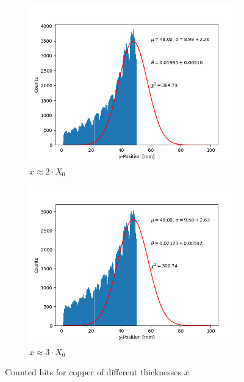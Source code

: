\documentclass[sn-mathphys-num,iicol]{sn-jnl}
\theoremstyle{thmstyleone}
\theoremstyle{thmstyletwo}
\theoremstyle{thmstylethree}
\begin{document}
\begin{figure}[h]
\begin{subfigure}{0.49\textwidth}
        \includegraphics[width=\textwidth]{../src/elsa/finished_plots/Copper, Two Radiation Lengths, 40cm Distance.png}
        \caption{$x\approx2\cdot X_0$}
    \end{subfigure}
    \begin{subfigure}{0.49\textwidth}
        \includegraphics[width=\textwidth]{../src/elsa/finished_plots/Copper, Three Radiation Lengths, 40cm Distance.png}
        \caption{$x\approx3\cdot X_0$}
    \end{subfigure}
    \caption{Counted hits for copper of different thicknesses $x$.}
    \label{fig:cop_gaus}
\end{figure}
\end{document}
